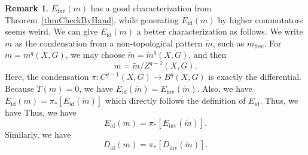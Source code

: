 \documentclass[reprint, amsmath, amssymb, showpacs, floatfix, longbibliography, aps, twocolumn, superscriptaddress, nofootinbib]{revtex4-2}
\newcommand{\id}{{\operatorname{id}}}
\newcommand{\inv}{{\operatorname{inv}}}
\theoremstyle{definition}
\newtheorem{remark}{Remark}[section]
\begin{document}
\begin{remark}\label{remarkAnotherDefOfEid}
	$E_\inv(m)$ has a good characterization from Theorem~\ref{thmCheckByHand}, 
	while generating $E_\id(m)$ by higher commutators seems weird. We can give $E_\id(m)$ a better characterization as follows. We write $m$ as the condensation from a non-topological pattern $\tilde{m}$, such as $m_{\operatorname{free}}$. For $m=m^q(X,G)$, we may choose $\tilde{m}=\tilde{m}^q(X,G)$, and then
	\begin{equation}
		m=\tilde{m}/Z^{q-1}(X,G).
	\end{equation}
	Here, the condensation $\pi: C^{q-1}(X,G)\rightarrow B^q(X,G)$ is exactly the differential. Because $T(m)=0$, we have $E_\id(\tilde{m})=E_\inv(\tilde{m})$. Also, we have $E_\id(m)=\pi_*[E_\id(\tilde{m})]$ which directly follows the definition of $E_\id$. Thus, we have
	Thus, we have
	\begin{equation}
		E_{\operatorname{id}}(m)=\pi_*[E_{\operatorname{inv}}(\tilde{m})].
	\end{equation}
	Similarly, we have
	\begin{equation}
		D_{\operatorname{id}}(m)=\pi_*[D_{\operatorname{inv}}(\tilde{m})].
	\end{equation}
\end{remark}
\end{document}
